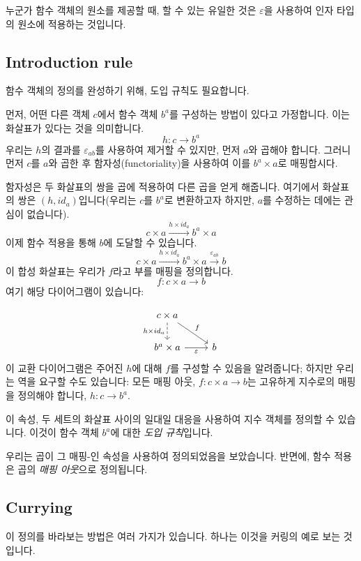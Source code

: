 \documentclass[DaoFP]{subfiles}
\begin{document}
\begin{CJK*}{UTF8}{gbsn}
누군가 함수 객체의 원소를 제공할 때, 할 수 있는 유일한 것은 $\varepsilon$을 사용하여 인자 타입의 원소에 적용하는 것입니다.

\subsection{Introduction rule}
함수 객체의 정의를 완성하기 위해, 도입 규칙도 필요합니다.

먼저, 어떤 다른 객체 $c$에서 함수 객체 $b^a$를 구성하는 방법이 있다고 가정합니다. 이는 화살표가 있다는 것을 의미합니다.
\[h \colon c \to b^a\]
우리는 $h$의 결과를 $\varepsilon_{a b}$를 사용하여 제거할 수 있지만, 먼저 $a$와 곱해야 합니다. 그러니 먼저 $c$를 $a$와 곱한 후 함자성(functoriality)을 사용하여 이를 $b^a \times a$로 매핑합시다.

함자성은 두 화살표의 쌍을 곱에 적용하여 다른 곱을 얻게 해줍니다. 여기에서 화살표의 쌍은 $(h, id_a)$입니다(우리는 $c$를 $b^a$로 변환하고자 하지만, $a$를 수정하는 데에는 관심이 없습니다).
\[ c \times a \xrightarrow{h \times id_a} b^a \times a \]
이제 함수 적용을 통해 $b$에 도달할 수 있습니다.
\[ c \times a \xrightarrow{h \times id_a} b^a \times a \xrightarrow{\varepsilon_{a b}} b\]
이 합성 화살표는 우리가 $f$라고 부를 매핑을 정의합니다.
\[f \colon c \times a \to b\]
여기 해당 다이어그램이 있습니다:

\[
 \begin{tikzcd}
 c \times a
 \arrow[d, dashed, "h \times id_a"']
 \arrow[rd, "f"]
 \\
 b^a \times a
 \arrow[r, "\varepsilon"']
& b
 \end{tikzcd}
\]
이 교환 다이어그램은 주어진 $h$에 대해 $f$를 구성할 수 있음을 알려줍니다; 하지만 우리는 역을 요구할 수도 있습니다: 모든 매핑 아웃, $f \colon c \times a \to b$는 고유하게 지수로의 매핑을 정의해야 합니다, $h \colon c \to b^a$.

이 속성, 두 세트의 화살표 사이의 일대일 대응을 사용하여 지수 객체를 정의할 수 있습니다. 이것이 함수 객체 $b^a$에 대한 \emph{도입 규칙}입니다.

우리는 곱이 그 매핑-인 속성을 사용하여 정의되었음을 보았습니다. 반면에, 함수 적용은 곱의 \emph{매핑 아웃}으로 정의됩니다.

\subsection{Currying}

이 정의를 바라보는 방법은 여러 가지가 있습니다. 하나는 이것을 커링의 예로 보는 것입니다.


\end{CJK*}
\end{document}
